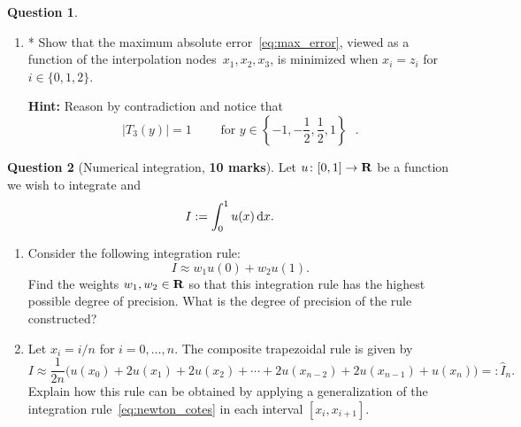 \documentclass[11pt]{article}
\theoremstyle{definition}
\newtheorem{question}{Question}
\theoremstyle{remark}
\theoremstyle{plain}%
\begin{document}
\begin{question}
\begin{enumerate}
        \item
            *
            Show that the maximum absolute error~\eqref{eq:max_error},
            viewed as a function of the interpolation nodes~$x_1, x_2, x_3$,
            is minimized when $x_i = z_i$ for $i \in \{0, 1, 2\}$.

            \textbf{Hint:} Reason by contradiction and notice that
            \[
                \bigl\lvert T_3(y) \bigr\rvert = 1
                \qquad \text{ for $y \in \left\{-1, -\frac{1}{2}, \frac{1}{2}, 1 \right\}$  }.
            \]
    \end{enumerate}
\end{question}

\newpage
\begin{question}
    [Numerical integration, \textbf{10 marks}]
    Let $u \colon [0, 1] \to \mathbf R$ be a function we wish to integrate and
    \[
        I := \int_{0}^{1} u(x) \, \mathrm d x.
    \]
    \begin{enumerate}
        \item
        Consider the following integration rule:
        \begin{equation}
            \label{eq:newton_cotes}
            I\approx w_1 u(0) + w_2 u(1).
        \end{equation}
        Find the weights $w_1, w_2 \in \mathbf R$ so that this integration rule has the highest possible degree of precision.
        What is the degree of precision of the rule constructed?


        \item
            Let $x_i = i/n$ for $i = 0, \dotsc, n$.
            The composite trapezoidal rule is given by
            \begin{equation}
                \label{eq:composite_rule}
                I
                \approx \frac{1}{2n} \bigl( u(x_0) + 2 u(x_1) + 2 u(x_2) + \dotsb + 2 u(x_{n-2}) + 2 u(x_{n-1}) + u(x_n) \bigr) =: \widehat I_n.
            \end{equation}
            Explain how this rule can be obtained by applying a generalization of the integration rule~\eqref{eq:newton_cotes} in each interval $[x_i, x_{i+1}]$.


\end{enumerate}
\end{question}
\end{document}
